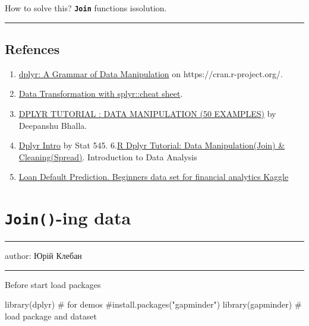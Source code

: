 \documentclass[
  letterpaper,
  DIV=11,
  numbers=noendperiod]{scrreprt}
\newenvironment{Shaded}{\begin{snugshade}}{\end{snugshade}}
\newcommand{\CommentTok}[1]{\textcolor[rgb]{0.37,0.37,0.37}{#1}}
\newcommand{\FunctionTok}[1]{\textcolor[rgb]{0.28,0.35,0.67}{#1}}
\newcommand{\NormalTok}[1]{\textcolor[rgb]{0.00,0.23,0.31}{#1}}
\providecommand{\tightlist}{%
  \setlength{\itemsep}{0pt}\setlength{\parskip}{0pt}}\usepackage{longtable,booktabs,array}
\begin{document}
How to solve this? \textbf{\texttt{Join}} functions issolution.

\begin{center}\rule{0.5\linewidth}{0.5pt}\end{center}

\section{Refences}\label{refences-7}

\begin{enumerate}
\def\labelenumi{\arabic{enumi}.}
\tightlist
\item
  \href{https://cran.r-project.org/web/packages/dplyr/index.html}{dplyr:
  A Grammar of Data Manipulation} on https://cran.r-project.org/.
\item
  \href{https://github.com/rstudio/cheatsheets/blob/master/data-transformation.pdf}{Data
  Transformation with splyr::cheat sheet}.
\item
  \href{https://www.listendata.com/2016/08/dplyr-tutorial.html}{DPLYR
  TUTORIAL : DATA MANIPULATION (50 EXAMPLES)} by Deepanshu Bhalla.
\item
  \href{https://stat545.com/dplyr-intro.html}{Dplyr Intro} by Stat 545.
  6.\href{https://www.guru99.com/r-dplyr-tutorial.html}{R Dplyr
  Tutorial: Data Manipulation(Join) \& Cleaning(Spread)}. Introduction
  to Data Analysis
\item
  \href{https://www.kaggle.com/kmldas/loan-default-prediction}{Loan
  Default Prediction. Beginners data set for financial analytics Kaggle}
\end{enumerate}

\chapter{\texorpdfstring{\texttt{Join()}-ing
data}{Join()-ing data}}\label{join-ing-data}

\begin{center}\rule{0.5\linewidth}{0.5pt}\end{center}

author: Юрій Клебан

\begin{center}\rule{0.5\linewidth}{0.5pt}\end{center}

Before start load packages

\begin{Shaded}
\begin{Highlighting}[]
\FunctionTok{library}\NormalTok{(dplyr) }\CommentTok{\# for demos}
\CommentTok{\#install.packages("gapminder")}
\FunctionTok{library}\NormalTok{(gapminder)  }\CommentTok{\# load package and dataset}
\end{Highlighting}
\end{Shaded}
\end{document}
